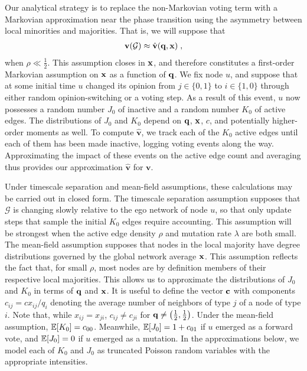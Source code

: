 \documentclass[review, onefignum, onetabnum]{siamart171218}
\begin{document}
		Our analytical strategy is to replace the non-Markovian voting term with a Markovian approximation near the phase transition using the asymmetry between local minorities and majorities. 
		That is, we will suppose that 
		\begin{align}
			\mathbf{v}(\mathcal{G}) \approx \hat{\mathbf{v}}(\q, \x)\;, \label{eq:markov}
		\end{align}
		when $\rho \ll \frac{1}{2}$. 
		This assumption closes  in $\mathbf{x}$, and therefore constitutes a first-order Markovian assumption on $\mathbf{x}$ as a function of $\mathbf{q}$. 
		We fix node $u$, and suppose that at some initial time $u$ changed its opinion from $j \in \{0,1\}$ to $i \in \{1,0\}$ through either random opinion-switching or a voting step. 
		As a result of this event, $u$ now possesses a  random number $J_0$ of inactive and a random number $K_0$ of active edges. 
		The distributions of $J_0$ and $K_0$ depend on $\mathbf{q}$, $\mathbf{x}$, $c$, and potentially higher-order moments as well. 
		To compute $\hat{\mathbf{v}}$, we track each of the $K_0$ active edges until each of them has been made inactive, logging voting events along the way.
		Approximating the impact of these events on the active edge count and averaging thus provides our approximation $\hat{\mathbf{v}}$ for $\mathbf{v}$.
		
		Under timescale separation and mean-field   assumptions, these calculations may be carried out in closed form. 
		The timescale separation assumption supposes that $\mathcal{G}$ is changing slowly relative to the ego network of node $u$, so that only update steps that sample the initial $K_0$ edges require accounting. 
		This assumption will be strongest when the active edge density $\rho$ and mutation rate $\lambda$ are both small. 
		The mean-field assumption supposes that nodes in the local majority have degree distributions governed by the global network average $\mathbf{x}$. 
		This assumption reflects the fact that, for small $\rho$, most nodes are by definition members of their respective local majorities. 
		This allows us to approximate the distributions of $J_0$ and $K_0$ in terms of $\mathbf{q}$ and $\mathbf{x}$. 
		It is useful to define the vector $\mathbf{c}$ with components $c_{ij} = c{x_{ij}}/{q_i}$ denoting the average number of neighbors of type $j$ of a node of type $i$. 
		Note that, while $x_{ij} = x_{ji}$, $c_{ij} \neq c_{ji}$ for $\mathbf{q} \neq \left(\frac{1}{2}, \frac{1}{2}\right)$.
		Under the mean-field assumption, $\mathbb{E}[K_0] = c_{00}$. 
		Meanwhile, $\mathbb{E}[J_0] = 1 + c_{01}$ if $u$ emerged as a forward vote, and $\mathbb{E}[J_0] = 0$ if $u$ emerged as a mutation. 
		In the approximations below, we model each of $K_0$ and $J_0$ as truncated Poisson random variables with the appropriate intensities. 
\end{document}

